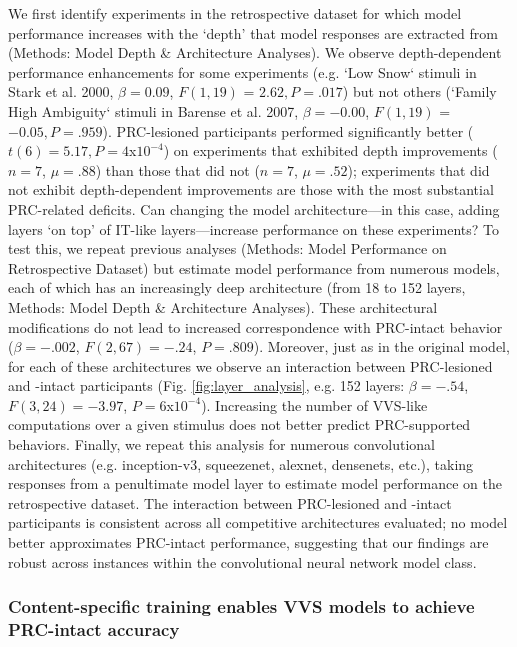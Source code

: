 \documentclass[11pt]{article}
\begin{document}
We first identify experiments in the retrospective dataset for which model performance increases with the `depth' that model responses are extracted from (Methods: Model Depth \& Architecture Analyses). We observe depth-dependent performance enhancements for some experiments (e.g. `Low Snow` stimuli in Stark et al. 2000,  $\beta = 0.09$, $F(1, 19)$ = $2.62, P = .017$) but not others (`Family High Ambiguity` stimuli in Barense et al. 2007, $\beta = -0.00$, $F(1, 19)$ = $-0.05, P = .959$). PRC-lesioned participants performed significantly better ($t(6) = 5.17,P = 4$x$10^{-4}$) on experiments that exhibited depth improvements ($n=7$, $\mu=.88$) than those that did not ($n=7$, $\mu=.52$); experiments that did not exhibit depth-dependent improvements are those with the most substantial PRC-related deficits. Can changing the model architecture---in this case, adding layers  `on top' of IT-like layers---increase performance on these experiments? To test this, we repeat previous analyses (Methods: Model Performance on Retrospective Dataset) but estimate model performance from numerous models, each of which has an increasingly deep architecture (from 18 to 152 layers, Methods: Model Depth \& Architecture Analyses). These architectural modifications do not lead to increased correspondence with PRC-intact behavior ($\beta = -.002$,  $F(2, 67) =-.24$, $P = .809$). Moreover, just as in the original model, for each of these architectures we observe an interaction between PRC-lesioned and -intact participants (Fig. \ref{fig:layer_analysis}, e.g. 152 layers: $\beta = -.54$,  $F(3, 24) =-3.97$, $P = 6$x$10^{-4}$). Increasing the number of VVS-like computations over a given stimulus does not better predict PRC-supported behaviors. Finally, we repeat this analysis for numerous convolutional architectures (e.g. inception-v3, squeezenet, alexnet, densenets, etc.), taking responses from a penultimate model layer to estimate model performance on the retrospective dataset. The interaction between PRC-lesioned and -intact participants is consistent across all competitive architectures evaluated; no model better approximates PRC-intact performance, suggesting that our findings are robust across instances within the convolutional neural network model class. 

\subsubsection{Content-specific training enables VVS models to achieve PRC-intact accuracy}
\end{document}
